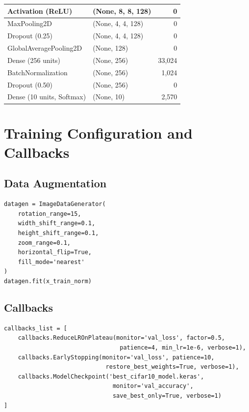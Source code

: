 \documentclass[11pt]{article}
\begin{document}
\begin{table}[H]
\begin{tabular}{|l|l|r|}
        Activation (ReLU) & (None, 8, 8, 128) & 0 \\ \hline
        MaxPooling2D & (None, 4, 4, 128) & 0 \\ \hline
        Dropout (0.25) & (None, 4, 4, 128) & 0 \\ \hline
        GlobalAveragePooling2D & (None, 128) & 0 \\ \hline
        Dense (256 units) & (None, 256) & 33,024 \\ \hline
        BatchNormalization & (None, 256) & 1,024 \\ \hline
        Dropout (0.50) & (None, 256) & 0 \\ \hline
        Dense (10 units, Softmax) & (None, 10) & 2,570 \\ \hline
        \hline
    \end{tabular}
\end{table}

\section{Training Configuration and Callbacks}

\subsection{Data Augmentation}
\begin{lstlisting}[caption={ImageDataGenerator configuration for on-the-fly data augmentation}]
datagen = ImageDataGenerator(
    rotation_range=15,
    width_shift_range=0.1,
    height_shift_range=0.1,
    zoom_range=0.1,
    horizontal_flip=True,
    fill_mode='nearest'
)
datagen.fit(x_train_norm)
\end{lstlisting}

\subsection{Callbacks}
\begin{lstlisting}[caption={Training callbacks for adaptive optimization and checkpointing}]
callbacks_list = [
    callbacks.ReduceLROnPlateau(monitor='val_loss', factor=0.5,
                                 patience=4, min_lr=1e-6, verbose=1),
    callbacks.EarlyStopping(monitor='val_loss', patience=10,
                             restore_best_weights=True, verbose=1),
    callbacks.ModelCheckpoint('best_cifar10_model.keras',
                               monitor='val_accuracy',
                               save_best_only=True, verbose=1)
]
\end{lstlisting}
\end{document}
